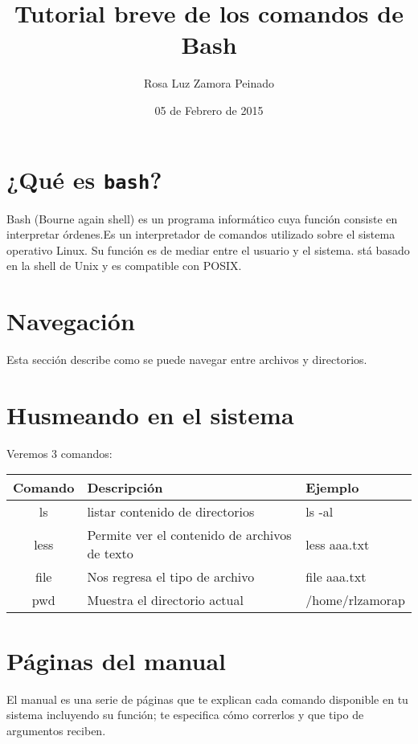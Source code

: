 \documentclass[12pt]{article}
\title{Tutorial breve de los comandos de Bash}
\author{Rosa Luz Zamora Peinado}
\date{05 de Febrero de 2015}
\begin{document}
\maketitle

\section{¿Qué es {\tt bash}?}

Bash (Bourne again shell) es un programa informático cuya función consiste en interpretar órdenes.Es un interpretador de comandos utilizado sobre el sistema operativo Linux. Su función es de mediar entre el usuario y el sistema. stá basado en la shell de Unix y es compatible con POSIX.

\section{Navegación}

Esta sección describe como se puede navegar entre archivos y directorios.

\section{Husmeando en el sistema}

Veremos 3 comandos:\\


\begin{tabular}{|c|l|l|}
\hline
Comando & Descripción & Ejemplo \\
\hline
ls & listar contenido de directorios & ls -al \\ \hline
less & Permite ver el contenido de archivos de texto & less aaa.txt \\ 
\hline
file & Nos regresa el tipo de archivo & file aaa.txt \\
\hline
pwd & Muestra el directorio actual & /home/rlzamorap \\
\hline
\end{tabular} 

\section{Páginas del manual}

El manual es una serie de páginas que te explican cada comando disponible en tu sistema incluyendo su función; te especifica cómo correrlos y que tipo de argumentos reciben.\\
\end{document}
